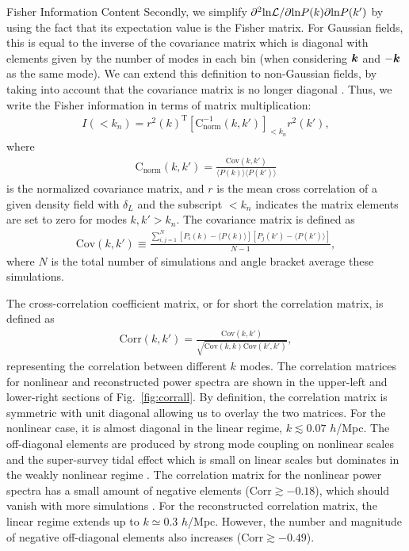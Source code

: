 \begin{section}{Fisher Information Content}
  Secondly, we simplify
  $\partial ^2 \mathrm{ln \mathcal{L}}/\partial \mathrm{ln} P(k) \partial
  \mathrm{ln} P(k')$
  by using the fact that its expectation value is the Fisher
  matrix.  For Gaussian fields, this is equal to the inverse of the
  covariance matrix which is diagonal with elements given by the
  number of modes in each bin (when considering $\boldsymbol{k}$ and $-\boldsymbol{k}$ as the same mode).  
  We can extend this definition to
  non-Gaussian fields, by taking into account that the covariance
  matrix is no longer diagonal \cite{bib:Rimes2006}.  Thus, we
  write the Fisher information in terms of matrix multiplication:
  \begin{align}
    I \left( < k_n\right) = r^2(k)^{\mathrm{T}} \left[ \mathrm{C^{-1}_{norm}} 
    ( k,k' )\right]_{<k_n} r^2(k') ,
    \label{eq:fisherformulaused}
  \end{align}
  where
  \begin{align}
    \mathrm{C_{norm}} \left( k,k' \right)=\frac{\mathrm{Cov}(k,k')}
    {\langle P(k)\rangle\langle P(k')\rangle}
  \end{align}
  is the normalized covariance matrix, and
  $r$ is the mean cross correlation of a given density field with
  $\delta_L$ and the subscript $<k_n$ indicates the matrix elements are set to
  zero for modes $k,k'>k_n$.  The covariance matrix is defined as
  \begin{align}
    \mathrm{Cov}\left(k,k'\right)\equiv \frac{\sum_{i,j=1}^{N}\left[ P_i \left( k \right) - 
    \langle P \left( k \right) \rangle \right]\left[ P_j \left( k' \right) - 
    \langle P \left( k' \right)\rangle \right]}{N-1},
  \end{align}
  where $N$ is the total number of simulations and angle bracket average these simulations.  

  The cross-correlation coefficient matrix, or for short the correlation matrix, 
  is defined as 
  \begin{align}
    \mathrm{Corr}\left(k,k'\right)=\frac{\mathrm{Cov}\left(k,k'\right)}
    {\sqrt{\mathrm{Cov}\left(k,k\right)\mathrm{Cov}\left(k',k'\right)}},
  \end{align}
  representing the correlation between different $k$ modes.  The
  correlation matrices for nonlinear and reconstructed power spectra
  are shown in the upper-left and lower-right sections of Fig.~\ref{fig:corrall}.
  By definition, the correlation matrix is symmetric with unit
  diagonal allowing us to overlay the two matrices.  For the
  nonlinear case, it is almost diagonal in the linear
  regime, $k \lesssim 0.07$ $h$/Mpc.  The off-diagonal
  elements are produced by strong mode coupling on nonlinear scales
  and the super-survey tidal effect which is small on linear scales
  but dominates in the weakly nonlinear regime
  \cite{bib:Kazuyuki2016}.  The correlation matrix for the nonlinear
  power spectra has a small amount of negative elements
  ($\mathrm{Corr} \gtrsim -0.18$), which should vanish with more
  simulations \cite{bib:Takahashi2009}.  For the reconstructed
  correlation matrix, the linear regime extends up to $k \simeq 0.3$
  $h$/Mpc.  However, the number and magnitude of negative off-diagonal elements
  also increases ($\mathrm{Corr} \gtrsim -0.49$).


\end{section}
